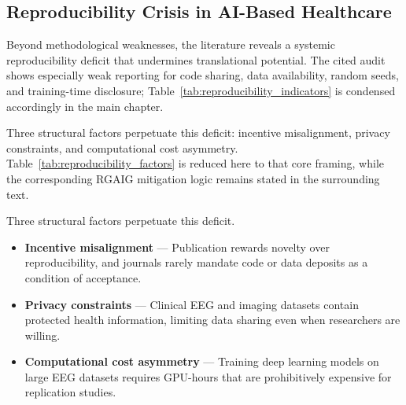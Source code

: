 \subsection{Reproducibility Crisis in AI-Based Healthcare}

Beyond methodological weaknesses, the literature reveals a systemic reproducibility deficit that undermines translational potential. The cited audit shows especially weak reporting for code sharing, data availability, random seeds, and training-time disclosure; Table~\ref{tab:reproducibility_indicators} is condensed accordingly in the main chapter.

Three structural factors perpetuate this deficit: incentive misalignment, privacy constraints, and computational cost asymmetry. Table~\ref{tab:reproducibility_factors} is reduced here to that core framing, while the corresponding RGAIG mitigation logic remains stated in the surrounding text.

\iffalse %
Three structural factors perpetuate this deficit.

\begin{itemize}[leftmargin=*, itemsep=3pt]
  \item \textbf{Incentive misalignment} --- Publication rewards novelty over reproducibility, and journals rarely mandate code or data deposits as a condition of acceptance.
  \item \textbf{Privacy constraints} --- Clinical EEG and imaging datasets contain protected health information, limiting data sharing even when researchers are willing.
  \item \textbf{Computational cost asymmetry} --- Training deep learning models on large EEG datasets requires GPU-hours that are prohibitively expensive for replication studies.
\end{itemize}


